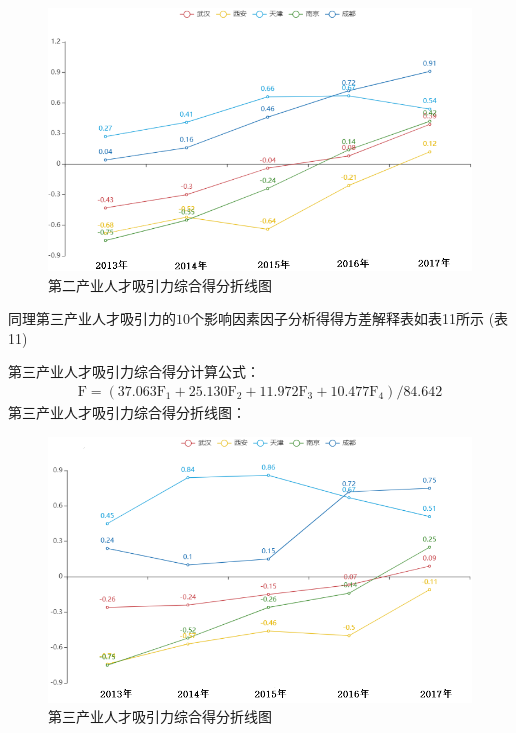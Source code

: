 \documentclass{whutmod}
\begin{document}
	\begin{figure}[H]
		\centering
		\includegraphics[width=\textwidth]{figures/22.png}
		\caption{第二产业人才吸引力综合得分折线图}\label{22}
	\end{figure}
	
	同理第三产业人才吸引力的$10$个影响因素因子分析得得方差解释表如表11所示
	(表11)
	
	第三产业人才吸引力综合得分计算公式：
	\begin{gather}
	\mathrm { F } = \left( 37.063 \mathrm { F } _ { 1 } + 25.130 \mathrm { F } _ { 2 } + 11.972 \mathrm { F } _ { 3 } + 10.477 \mathrm { F } _ { 4 } \right) / 84.642
	\end{gather}
	第三产业人才吸引力综合得分折线图：
		\begin{figure}[H]
		\centering
		\includegraphics[width=\textwidth]{figures/33.png}
		\caption{第三产业人才吸引力综合得分折线图}\label{33}
	\end{figure}
\end{document}

